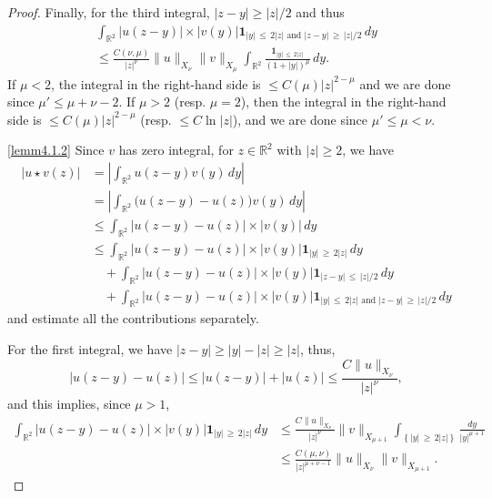 \documentclass[AHL,Unicode,longabstracts,published]{cedram}
\newcommand*\R{\mathbb R}
\newcommand{\bfun}{\mathbf{1}}
\newcommand*\gs{\geqslant }
\newcommand*\ls{\leqslant }
\begin{document}
\begin{proof}
Finally, for the third integral, $ |z-y| \gs |z| /2 $ and thus
\begin{multline*}
\int_{\R^2} \lvert u (z-y) \rvert \times \lvert v(y) \rvert \bfun_{|y|\,\ls\,2 |z| \text{ and } |z-y|\,\gs\,|z| /2 } \, dy \\ \ls \frac{C(\nu, \mu)}{|z|^\nu} \| u \|_{X_{\nu}} \| v \|_{X_{\mu}}
\int_{\R^2} \frac{\bfun_{|y|\,\ls\,2 |z| }}{ (1+|y|)^\mu} \, dy.
\end{multline*}
If $ \mu < 2 $, the integral in the right-hand side is $ \ls C (\mu) |z|^{2 - \mu} $ and we are done since $ \mu ' \ls \mu + \nu - 2 $. If $ \mu > 2 $ (resp. $ \mu = 2 $), then the integral in the right-hand side is $ \ls C (\mu) |z|^{2 - \mu} $ (resp. $ \ls C \ln |z| $), and we are done since $ \mu ' \ls \mu < \nu $.


\noindent\eqref{lemm4.1.2} Since $ v $ has zero integral, for $ z \in \R^2 $ with $ |z| \gs 2 $, we have
\begin{align*}
\lvert u \star v (z) \rvert & = \left \lvert \int_{\R^2} u (z-y) v(y) \, dy \right\rvert
\\
& = \left \lvert \int_{\R^2} \big(u (z-y) - u (z) \big) v(y) \, dy \right \rvert
\\
& \ls \int_{\R^2} \lvert u (z-y) - u (z) \rvert \times \lvert v(y) \rvert \, dy
\\
& \ls
\int_{\R^2} \lvert u (z-y) - u (z) \rvert \times \lvert v(y) \rvert \bfun_{|y|\,\gs\,2 |z| } \, dy
\\
& \quad + \int_{\R^2} \lvert u (z-y) - u (z) \rvert \times \lvert v(y) \rvert \bfun_{ |z-y| \,\ls\,|z|/2 } \, dy
\\
& \quad + \int_{\R^2} \lvert u (z-y) - u (z) \rvert \times \lvert v(y) \rvert \bfun_{|y|\,\ls\,2 |z| \text{ and } |z-y|\,\gs\,|z| /2 } \, dy
\end{align*}
and estimate all the contributions separately.

For the first integral, we have $ |z-y| \gs |y| - |z| \gs |z| $, thus,
\[
\lvert u (z-y) - u (z) \rvert
\ls \lvert u (z-y) \rvert + \lvert u (z) \rvert
\ls \frac{C \| u \|_{X_{\nu}}}{ |z|^\nu },
\]
and this implies, since $ \mu > 1 $,
\begin{align*}
\int_{\R^2} \lvert u (z-y) - u (z) \rvert \times \lvert v(y) \rvert \bfun_{|y|\,\gs\,2 |z| } \, dy & \ls \frac{C \| u \|_{X_{\nu}} }{ |z|^\nu } \| v \|_{X_{\mu+1} }
\int_{\left\{ |y|\,\gs\,2 |z|\right\} } \frac{dy}{|y|^{\mu +1}}
\\
& \ls \frac{C(\mu, \nu)}{ |z|^{\mu + \nu -1 } } \| u \|_{X_{\nu}} \| v \|_{X_{\mu+1} }.
\end{align*}


\end{proof}
\end{document}
